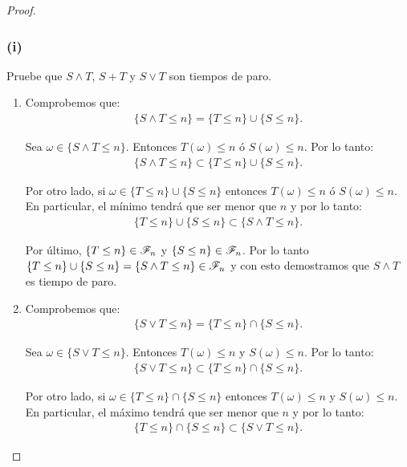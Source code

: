 \begin{proof}
	\subsubsection{(i)} 
		Pruebe que $ S \wedge T $, $ S + T $ y $ S \vee T$ son tiempos de paro.\\
	
		\begin{enumerate}
			\item 
				Comprobemos que:
				\begin{align}
					\{ S \wedge T \leq n \} = \{ T \leq n \} \cup \{ S \leq n\}.
				\end{align}
				
				Sea $\omega \in \{ S \wedge T \leq n \}$. Entonces $T(\omega) \leq n$ ó $S(\omega) \leq n$.
				Por lo tanto:
				\begin{align}
						\{ S \wedge T \leq n \} \subset \{ T \leq n \} \cup \{ S \leq n\}.							
				\end{align}
				
				Por otro lado, si $\omega \in \{ T \leq n \} \cup \{ S \leq n\}$ entonces $T(\omega) \leq n$ ó $S(\omega) \leq n$.
				En particular, el mínimo tendrá que ser menor que $n$ y por lo tanto:
				\begin{align}
						\{ T \leq n \} \cup \{ S \leq n\} \subset \{ S \wedge T \leq n \}.						
				\end{align}
				
				Por último, $\{ T \leq n \} \in \mathscr{F}_n$ y $\{ S \leq n \} \in \mathscr{F}_n$. Por lo tanto	\\	
				$\{ T \leq n \} \cup \{ S \leq n\} = \{ S \wedge T \leq n \} \in \mathscr{F}_n$ y con esto demostramos que 
				$ S \wedge T$ es tiempo de paro.\\
				
			\item
				Comprobemos que:
				\begin{align}
					\{ S \vee T \leq n \} = \{ T \leq n \} \cap \{ S \leq n\}.
				\end{align}
				
				Sea $\omega \in \{ S \vee T \leq n \}$. Entonces $T(\omega) \leq n$ y $S(\omega) \leq n$.
				Por lo tanto:
				\begin{align}
						\{ S \vee T \leq n \} \subset \{ T \leq n \} \cap \{ S \leq n\}.							
				\end{align}
				
				Por otro lado, si $\omega \in \{ T \leq n \} \cap \{ S \leq n\}$ entonces $T(\omega) \leq n$ y $S(\omega) \leq n$.
				En particular, el máximo tendrá que ser menor que $n$ y por lo tanto:
				\begin{align}
						\{ T \leq n \} \cap \{ S \leq n\} \subset \{ S \vee T \leq n \}.						
				\end{align}
				

\end{enumerate}
\end{proof}
